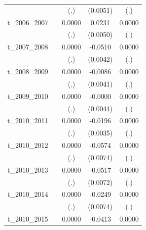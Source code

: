 \begin{table}[htbp]
\begin{tabular}{l*{4}{c}}
            &                     &         (.)         &    (0.0051)         &         (.)         \\
[1em]
t\_2006\_2007 &                     &      0.0000         &      0.0231\sym{***}&      0.0000         \\
            &                     &         (.)         &    (0.0050)         &         (.)         \\
[1em]
t\_2007\_2008 &                     &      0.0000         &     -0.0510\sym{***}&      0.0000         \\
            &                     &         (.)         &    (0.0042)         &         (.)         \\
[1em]
t\_2008\_2009 &                     &      0.0000         &     -0.0086\sym{**} &      0.0000         \\
            &                     &         (.)         &    (0.0041)         &         (.)         \\
[1em]
t\_2009\_2010 &                     &      0.0000         &     -0.0000         &      0.0000         \\
            &                     &         (.)         &    (0.0044)         &         (.)         \\
[1em]
t\_2010\_2011 &                     &      0.0000         &     -0.0196\sym{***}&      0.0000         \\
            &                     &         (.)         &    (0.0035)         &         (.)         \\
[1em]
t\_2010\_2012 &                     &      0.0000         &     -0.0574\sym{***}&      0.0000         \\
            &                     &         (.)         &    (0.0074)         &         (.)         \\
[1em]
t\_2010\_2013 &                     &      0.0000         &     -0.0517\sym{***}&      0.0000         \\
            &                     &         (.)         &    (0.0072)         &         (.)         \\
[1em]
t\_2010\_2014 &                     &      0.0000         &     -0.0249\sym{***}&      0.0000         \\
            &                     &         (.)         &    (0.0074)         &         (.)         \\
[1em]
t\_2010\_2015 &                     &      0.0000         &     -0.0413\sym{***}&      0.0000         \\

\end{tabular}
\end{table}

